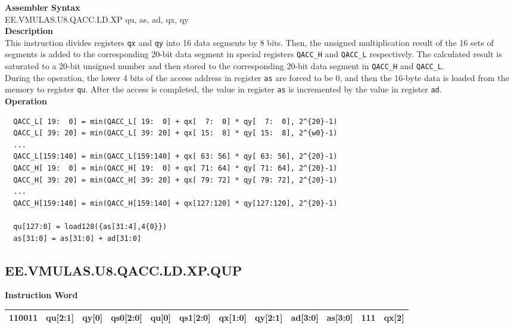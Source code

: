 \textbf{Assembler Syntax} \\
EE.VMULAS.U8.QACC.LD.XP qu, as, ad, qx, qy \\
\textbf{Description} \\
This instruction divides registers \lstinline{qx} and \lstinline{qy} into 16 data segments by 8 bits. Then, the unsigned multiplication result of the 16 sets of segments is added to the corresponding 20-bit data segment in special registers \lstinline{QACC_H} and \lstinline{QACC_L} respectively. The calculated result is saturated to a 20-bit unsigned number and then stored to the corresponding 20-bit data segment in \lstinline{QACC_H} and \lstinline{QACC_L}.\\
During the operation, the lower 4 bits of the access address in register \lstinline{as} are forced to be 0, and then the 16-byte data is loaded from the memory to register \lstinline{qu}. After the access is completed, the value in register \lstinline{as} is incremented by the value in register \lstinline{ad}.\\
\textbf{Operation}
\begin{lstlisting}
  QACC_L[ 19:  0] = min(QACC_L[ 19:  0] + qx[  7:  0] * qy[  7:  0], 2^{20}-1)
  QACC_L[ 39: 20] = min(QACC_L[ 39: 20] + qx[ 15:  8] * qy[ 15:  8], 2^{w0}-1)
  ...
  QACC_L[159:140] = min(QACC_L[159:140] + qx[ 63: 56] * qy[ 63: 56], 2^{20}-1)
  QACC_H[ 19:  0] = min(QACC_H[ 19:  0] + qx[ 71: 64] * qy[ 71: 64], 2^{20}-1)
  QACC_H[ 39: 20] = min(QACC_H[ 39: 20] + qx[ 79: 72] * qy[ 79: 72], 2^{20}-1)
  ...
  QACC_H[159:140] = min(QACC_H[159:140] + qx[127:120] * qy[127:120], 2^{20}-1)

  qu[127:0] = load128({as[31:4],4{0}})
  as[31:0] = as[31:0] + ad[31:0]
\end{lstlisting}

\clearpage
\subsection{EE.VMULAS.U8.QACC.LD.XP.QUP}\label{instruction:EEVMULASU8QACCLDXPQUP}
\setlength\tabcolsep{6pt}
\textbf{Instruction Word} \\
\begin{tabular}{|c|c|c|c|c|c|c|c|c|c|c|c|}
	\hline
	110011 & qu[2:1] & qy[0] & qs0[2:0] & qu[0] & qs1[2:0] & qx[1:0] & qy[2:1] & ad[3:0] & as[3:0] & 111 & qx[2] \\
	\hline
\end{tabular}

